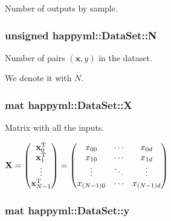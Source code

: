 Number of outputs by sample. 

\subsubsection[{\texorpdfstring{N}{N}}]{\setlength{\rightskip}{0pt plus 5cm}unsigned happyml\+::\+Data\+Set\+::N}\hypertarget{classhappyml_1_1DataSet_a18457530136087ab5e09e96125655ab5}{}\label{classhappyml_1_1DataSet_a18457530136087ab5e09e96125655ab5}


Number of pairs $(\mathbf{x}, y)$ in the dataset. 

We denote it with $N$. 
\subsubsection[{\texorpdfstring{X}{X}}]{\setlength{\rightskip}{0pt plus 5cm}mat happyml\+::\+Data\+Set\+::X}\hypertarget{classhappyml_1_1DataSet_a692f8bd10b94c74df7e7f9010c78820a}{}\label{classhappyml_1_1DataSet_a692f8bd10b94c74df7e7f9010c78820a}


Matrix with all the inputs. 

$ \mathbf{X} = \begin{pmatrix} \mathbf{x}^{\rm T}_0 \\ \mathbf{x}^{\rm T}_1 \\ \vdots \\ \mathbf{x}^{\rm T}_{N - 1} \end{pmatrix} = \begin{pmatrix} x_{00} & \cdots & x_{0d} \\ x_{10} & \cdots & x_{1d} \\ \vdots & \ddots & \vdots \\ x_{(N-1)0} & \cdots & x_{(N-1)d} \end{pmatrix} $ 
\subsubsection[{\texorpdfstring{y}{y}}]{\setlength{\rightskip}{0pt plus 5cm}mat happyml\+::\+Data\+Set\+::y}\hypertarget{classhappyml_1_1DataSet_ac75419fb46abcc2841226a8441674d48}{}\label{classhappyml_1_1DataSet_ac75419fb46abcc2841226a8441674d48}


